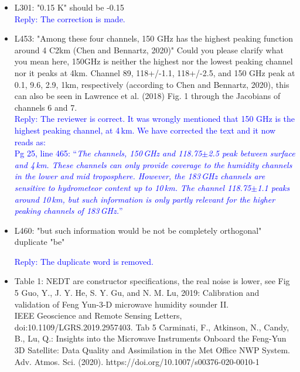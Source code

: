 \documentclass[11pt,a4paper,draft]{article}
\begin{document}
\begin{itemize}
		
\item	L301: "0.15 K" should be -0.15 \\
		
\textcolor{blue}{Reply: The correction is made.} \\
		
		
	
\item	
		L453: "Among these four channels, 150 GHz has the highest peaking function around 4
		C2km (Chen and Bennartz, 2020)" Could you please clarify what you mean here, 150GHz
		is neither the highest nor the lowest peaking channel nor it peaks at 4km. Channel 89,
		118+/-1.1, 118+/-2.5, and 150 GHz peak at 0.1, 9.6, 2.9, 1km, respectively (according
		to Chen and Bennartz, 2020), this can also be seen in Lawrence et al. (2018) Fig. 1
		through the Jacobians of channels 6 and 7.\\
	
\textcolor{blue}{Reply: The reviewer is correct. It was wrongly mentioned that 150 GHz is the highest peaking channel, at 4\,km. We have corrected the text and it now reads as:	\\
Pg 25, line 465:	
``\textit{The channels, 150\,GHz and 118.75$\pm$2.5 peak between surface and 4\,km. These channels can only provide coverage to the humidity channels in the lower and mid troposphere. However, the 183\,GHz channels are sensitive to hydrometeor content up to 10\,km. The channel 118.75$\pm$1.1 peaks around 10\,km, but such information is only partly relevant for the higher peaking channels of 183\,GHz.}'' }\\

		
\item	L460: "but such information would be not be completely orthogonal" duplicate "be"
		
\textcolor{blue}{Reply: The duplicate word is removed. }\\
		
		
		
\item	
		Table 1: NEDT are constructor specifications, the real noise is lower, see
		Fig 5 Guo, Y., J. Y. He, S. Y. Gu, and N. M. Lu, 2019: Calibration and validation of
		Feng Yun-3-D microwave humidity sounder II. \\
		IEEE Geoscience and Remote Sensing
		Letters, doi:10.1109/LGRS.2019.2957403.
		Tab 5 Carminati, F., Atkinson, N., Candy, B., Lu, Q.: Insights into the Microwave Instruments Onboard the Feng-Yun 3D Satellite: Data Quality and Assimilation in the Met Office NWP System. Adv. Atmos. Sci. (2020). https://doi.org/10.1007/s00376-020-0010-1 \\
	

\end{itemize}
\end{document}

